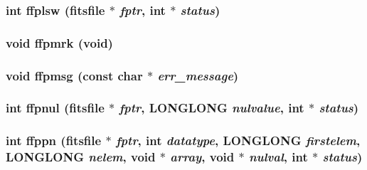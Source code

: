 \subsubsection{\setlength{\rightskip}{0pt plus 5cm}int ffplsw (\bf{fitsfile} $\ast$ {\em fptr}, int $\ast$ {\em status})}\label{test_2roimasker_2fitsio_8h_961af8c215ce5bb2d2d74ba7d5b02591}


\subsubsection{\setlength{\rightskip}{0pt plus 5cm}void ffpmrk (void)}\label{test_2roimasker_2fitsio_8h_b9700796363d20498ceec03ad6c3b976}


\subsubsection{\setlength{\rightskip}{0pt plus 5cm}void ffpmsg (const char $\ast$ {\em err\_\-message})}\label{test_2roimasker_2fitsio_8h_9db26b27c3c6d7589c44565df739c3d5}


\subsubsection{\setlength{\rightskip}{0pt plus 5cm}int ffpnul (\bf{fitsfile} $\ast$ {\em fptr}, \bf{LONGLONG} {\em nulvalue}, int $\ast$ {\em status})}\label{test_2roimasker_2fitsio_8h_611f557254bffac18cb113388849944a}


\subsubsection{\setlength{\rightskip}{0pt plus 5cm}int ffppn (\bf{fitsfile} $\ast$ {\em fptr}, int {\em datatype}, \bf{LONGLONG} {\em firstelem}, \bf{LONGLONG} {\em nelem}, void $\ast$ {\em array}, void $\ast$ {\em nulval}, int $\ast$ {\em status})}\label{test_2roimasker_2fitsio_8h_03027451cf6719b0ff4ffb8c6659b2a2}


